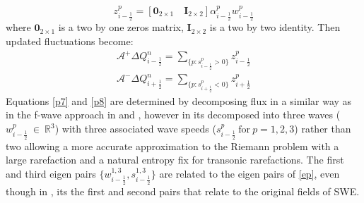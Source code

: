 \documentclass[11pt,a4paper]{article}
\begin{document}
	\begin{equation}
		z_{i-\frac{1}{2}}^{p} = [\mathbf{0}_{2\times1} \quad \mathbf{I}_{2\times2}] \alpha_{i-\frac{1}{2}}^{p} w_{i-\frac{1}{2}}^{p}
	\end{equation}
	where $\mathbf{0}_{2\times1}$ is a two by one zeros matrix, $\mathbf{I}_{2\times2}$ is a two by two identity. Then updated fluctuations become:
	\begin{eqnarray}
		\mathcal{A^{+}}\Delta Q_{i-\frac{1}{2}}^{n} = \sum_{\{ p:s_{i-\frac{1}{2}}^{p}>0\}}  z_{i-\frac{1}{2}}^{p}
		\label{p7}\\
		\mathcal{A^{-}}\Delta Q_{i+\frac{1}{2}}^{n} = \sum_{\{ p:s_{i+\frac{1}{2}}^{p}<0\}} z_{i+\frac{1}{2}}^{p}
		\label{p8}
	\end{eqnarray}
	Equations \ref{p7} and \ref{p8} are determined by decomposing flux in a similar way as in the f-wave approach in  \citet{ba-le-mi-ro:2003} and  \citet{george2006finite}, however in   \citet{ge:2008}  its decomposed into three waves ($w^{p}_{i-\frac{1}{2}} ~\in ~\mathbb{R}^{3}$)  with three associated wave speeds ($s^{p}_{i-\frac{1}{2}} ~\text{for}~ p =1,2,3$)  rather than two  allowing a more accurate approximation to the Riemann problem with a large rarefaction and a natural entropy fix for transonic rarefactions. The first and third eigen pairs $\{w^{1,3}_{i-\frac{1}{2}},s^{1,3}_{i-\frac{1}{2}}\}  $    are related to the eigen pairs of \eqref{ep}, even though in   \citet{be-ge-le-ma:2011}, its the first and second pairs that relate to the original fields of SWE. \\
	
\end{document}
